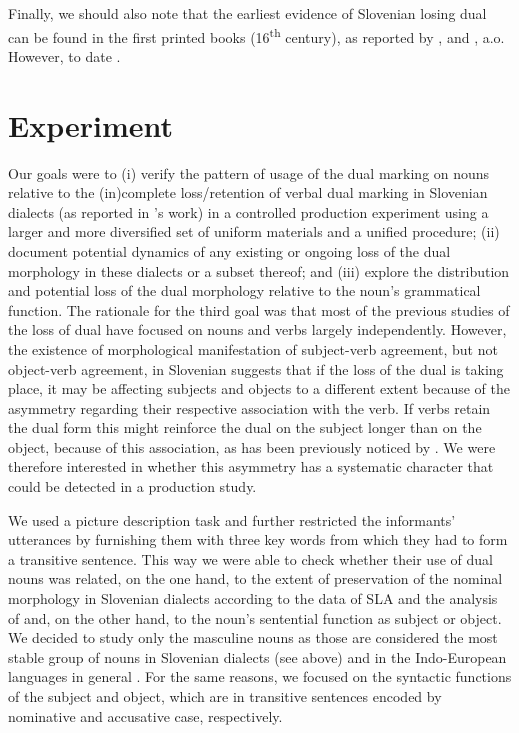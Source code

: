 \documentclass[output=paper,colorlinks,citecolor=brown]{langscibook}
\begin{document}
\noindent Finally, we should also note that the earliest evidence of Slovenian losing dual can be found in the first printed books (16\textsuperscript{th} century), as reported by \citet{Derganc2006}, \citet{Jakop2008} and \citet{Orel2019}, a.o. However, to date  \citep[145]{Jakop2008}.

\section{Experiment}\label{pav:sec:experiment}
Our goals were to (i) verify the pattern of usage of the dual marking on nouns relative to the (in)complete loss/retention of verbal dual marking in Slovenian dialects (as reported in \citeauthor{Jakop2008}'s \citeyear{Jakop2008} work) in a controlled production experiment using a larger and more diversified set of uniform materials and a unified procedure; (ii) document potential dynamics of any existing or ongoing loss of the dual morphology in these dialects or a subset thereof; and (iii) explore the distribution and potential loss of the dual morphology relative to the noun's grammatical function. The rationale for the third goal was that most of the previous studies of the loss of dual have focused on nouns and verbs largely independently. However, the existence of morphological manifestation of subject-verb agreement, but not object-verb agreement, in Slovenian suggests that if the loss of the dual is taking place, it may be affecting subjects and objects to a different extent because of the asymmetry regarding their respective association with the verb. If verbs retain the dual form this might reinforce the dual on the subject longer than on the object, because of this association, as has been previously noticed by \citet{Tesniere1925}. We were therefore interested in whether this asymmetry has a systematic character that could be detected in a production study.

We used a picture description task and further restricted the informants' utterances by furnishing them with three key words from which they had to form a transitive sentence. This way we were able to check whether their use of dual nouns was related, on the one hand, to the extent of preservation of the nominal morphology in Slovenian dialects according to the data of SLA and the analysis of \citet{Jakop2008} and, on the other hand, to the noun’s sentential function as subject or object. We decided to study only the masculine nouns as those are considered the most stable group of nouns in Slovenian dialects (see above) and in the Indo-European languages in general \citep{Tesniere1925}. For the same reasons, we focused on the syntactic functions of the subject and object, which are in transitive sentences encoded by nominative and accusative case, respectively. 
\end{document}
